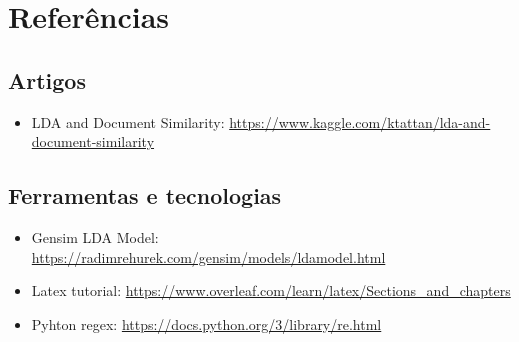 \section{Referências}

\subsection{Artigos}

\begin{itemize}
    \item LDA and Document Similarity: \url{https://www.kaggle.com/ktattan/lda-and-document-similarity}
\end{itemize}

\subsection{Ferramentas e tecnologias}

\begin{itemize}
    \item Gensim LDA Model: \url{https://radimrehurek.com/gensim/models/ldamodel.html}
    \item Latex tutorial: \url{https://www.overleaf.com/learn/latex/Sections\_and\_chapters}
    \item Pyhton regex: \url{https://docs.python.org/3/library/re.html}
\end{itemize}
